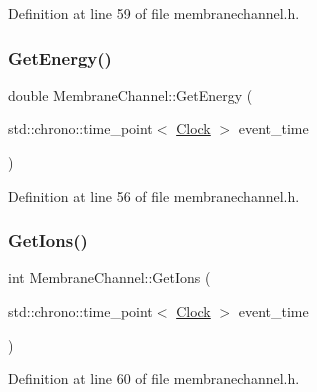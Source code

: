Definition at line 59 of file membranechannel.\+h.

\mbox{\label{class_membrane_channel_a25b542d8156c42ed785eebbea0db21a7}} 
\subsubsection{\texorpdfstring{Get\+Energy()}{GetEnergy()}}
{\footnotesize\ttfamily double Membrane\+Channel\+::\+Get\+Energy (\begin{DoxyParamCaption}\item[{std\+::chrono\+::time\+\_\+point$<$ \mbox{\hyperlink{universe_8h_a0ef8d951d1ca5ab3cfaf7ab4c7a6fd80}{Clock}} $>$}]{event\+\_\+time }\end{DoxyParamCaption})\hspace{0.3cm}{\ttfamily [inline]}}



Definition at line 56 of file membranechannel.\+h.

\mbox{\label{class_membrane_channel_af20c4ca6a3708c86122e7118a29952fd}} 
\subsubsection{\texorpdfstring{Get\+Ions()}{GetIons()}}
{\footnotesize\ttfamily int Membrane\+Channel\+::\+Get\+Ions (\begin{DoxyParamCaption}\item[{std\+::chrono\+::time\+\_\+point$<$ \mbox{\hyperlink{universe_8h_a0ef8d951d1ca5ab3cfaf7ab4c7a6fd80}{Clock}} $>$}]{event\+\_\+time }\end{DoxyParamCaption})\hspace{0.3cm}{\ttfamily [inline]}}



Definition at line 60 of file membranechannel.\+h.

\mbox{\label{class_membrane_channel_a91ce6506a8e82905de7cd031ed5d63f5}} 
